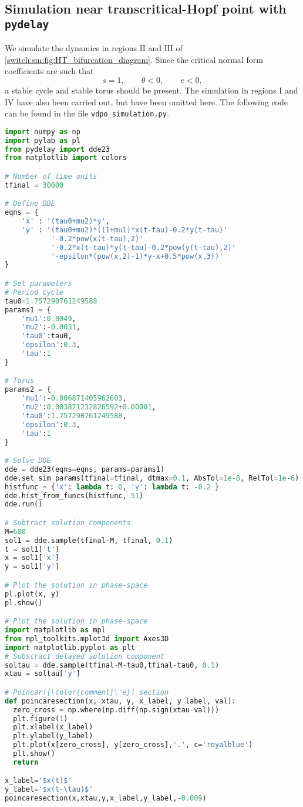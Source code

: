 \subsection{Simulation near transcritical-Hopf point with \texttt{pydelay}}
\label{switch:SM:sec:TH:simulation}
We simulate the dynamics in regions $\text{II}$ and $\text{III}$ of  \cref{switch:sm:fig:HT_bifurcation_diagram}. Since the critical normal form coefficients are such that
\[
s=1,\qquad \theta<0, \qquad e<0,
\]
a stable cycle and stable torus should be present. %
The simulation in regions $\text{I}$ and $\text{IV}$ have also been carried out, but have been omitted here. The following code can be found in the file \lstinline|vdpo_simulation.py|.
\begin{lstlisting}[language=Python,escapechar=!]
import numpy as np
import pylab as pl
from pydelay import dde23
from matplotlib import colors

# Number of time units
tfinal = 30000

# Define DDE
eqns = {
    'x' : '(tau0+mu2)*y',
    'y' : '(tau0+mu2)*((1+mu1)*x(t-tau)-0.2*y(t-tau)'
           '-0.2*pow(x(t-tau),2)'
           '-0.2*x(t-tau)*y(t-tau)-0.2*pow(y(t-tau),2)'
           '-epsilon*(pow(x,2)-1)*y-x+0.5*pow(x,3))'
}

# Set parameters
# Period cycle
tau0=1.757290761249588
params1 = {
    'mu1':0.0049,
    'mu2':-0.0031,
    'tau0':tau0,
    'epsilon':0.3,
    'tau':1
}

# Torus
params2 = {
    'mu1':-0.006871405962603,
    'mu2':0.003871232826592+0.00001,
    'tau0':1.757290761249588,
    'epsilon':0.3,
    'tau':1
}

# Solve DDE
dde = dde23(eqns=eqns, params=params1)
dde.set_sim_params(tfinal=tfinal, dtmax=0.1, AbsTol=1e-8, RelTol=1e-6)
histfunc = {'x': lambda t: 0, 'y': lambda t: -0.2 }
dde.hist_from_funcs(histfunc, 51)
dde.run()

# Subtract solution components
M=600
sol1 = dde.sample(tfinal-M, tfinal, 0.1)
t = sol1['t']
x = sol1['x']
y = sol1['y']

# Plot the solution in phase-space
pl.plot(x, y)
pl.show()

# Plot the solution in phase-space
import matplotlib as mpl
from mpl_toolkits.mplot3d import Axes3D
import matplotlib.pyplot as plt
# Substract delayed solution component
soltau = dde.sample(tfinal-M-tau0,tfinal-tau0, 0.1)
xtau = soltau['y']

# Poincar!{\color{comment}\'e}! section
def poincaresection(x, xtau, y, x_label, y_label, val):
  zero_cross = np.where(np.diff(np.sign(xtau-val)))
  plt.figure(1)
  plt.xlabel(x_label)
  plt.ylabel(y_label)
  plt.plot(x[zero_cross], y[zero_cross],'.', c='royalblue')
  plt.show()
  return

x_label='$x(t)$'
y_label='$x(t-\tau)$'
poincaresection(x,xtau,y,x_label,y_label,-0.009)
\end{lstlisting}


